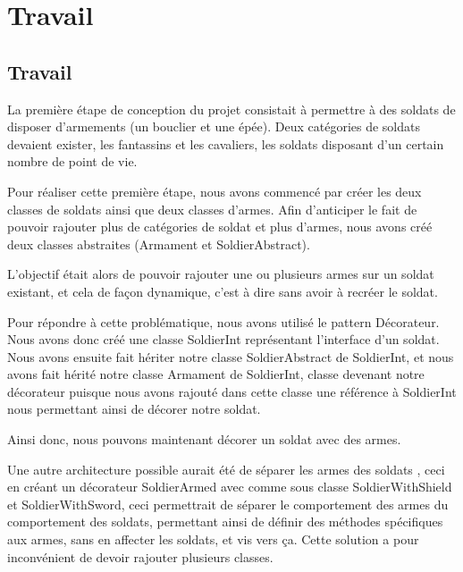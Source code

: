 \chapter{Travail}
\minitoc

\section{Travail}

La première étape de conception du projet consistait à permettre à des soldats de disposer d'armements (un bouclier et une épée). Deux catégories de soldats devaient exister, les fantassins et les cavaliers, les soldats disposant d'un certain nombre de point de vie.

Pour réaliser cette première étape, nous avons commencé par créer les deux classes de soldats ainsi que deux classes d'armes. Afin d'anticiper le fait de pouvoir rajouter plus de catégories de soldat et plus d'armes, nous avons créé deux classes abstraites (Armament et SoldierAbstract).  

L'objectif était alors de pouvoir rajouter une ou plusieurs armes sur un soldat existant, et cela de façon dynamique, c'est à dire sans avoir à recréer le soldat. 

Pour répondre à cette problématique, nous avons utilisé le pattern Décorateur. 
Nous avons donc créé une classe SoldierInt représentant l'interface d'un soldat. Nous avons ensuite fait hériter notre classe SoldierAbstract de SoldierInt, et nous avons fait hérité notre classe Armament de SoldierInt, classe devenant notre décorateur puisque nous avons rajouté dans cette classe une référence à SoldierInt nous permettant ainsi de décorer notre soldat.

Ainsi donc, nous pouvons maintenant décorer un soldat avec des armes.

Une autre architecture possible aurait été de séparer les armes des soldats , ceci en créant un décorateur SoldierArmed avec comme sous classe SoldierWithShield et SoldierWithSword, ceci permettrait de séparer le comportement des armes du comportement des soldats, permettant ainsi de définir des méthodes spécifiques aux armes, sans en affecter les soldats, et vis vers ça. Cette solution a pour inconvénient de devoir rajouter plusieurs classes.

